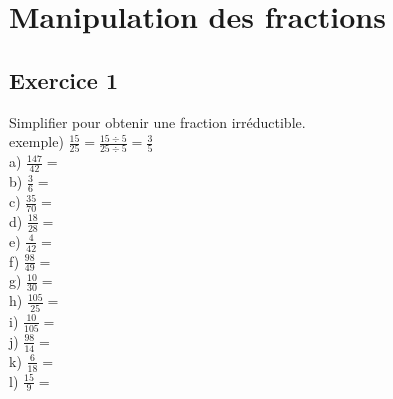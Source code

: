 \documentclass{article}
\begin{document}
\huge

\section*{Manipulation des fractions}
\subsection*{Exercice 1}
Simplifier pour obtenir une fraction irréductible.\\
exemple) $\frac{15}{25}=\frac{15\div5}{25\div5}=\frac{3}{5}$\\ 
\vspace{10 mm}
a) $\frac{147}{42}=$\\ 
\vspace{10 mm}
b) $\frac{3}{6}=$\\ 
\vspace{10 mm}
c) $\frac{35}{70}=$\\ 
\vspace{10 mm}
d) $\frac{18}{28}=$\\ 
\vspace{10 mm}
e) $\frac{4}{42}=$\\ 
\vspace{10 mm}
f) $\frac{98}{49}=$\\ 
\vspace{10 mm}
g) $\frac{10}{30}=$\\ 
\vspace{10 mm}
h) $\frac{105}{25}=$\\ 
\vspace{10 mm}
i) $\frac{10}{105}=$\\ 
\vspace{10 mm}
j) $\frac{98}{14}=$\\ 
\vspace{10 mm}
k) $\frac{6}{18}=$\\ 
\vspace{10 mm}
l) $\frac{15}{9}=$\\ 
\vspace{10 mm}
\newpage
\end{document}
